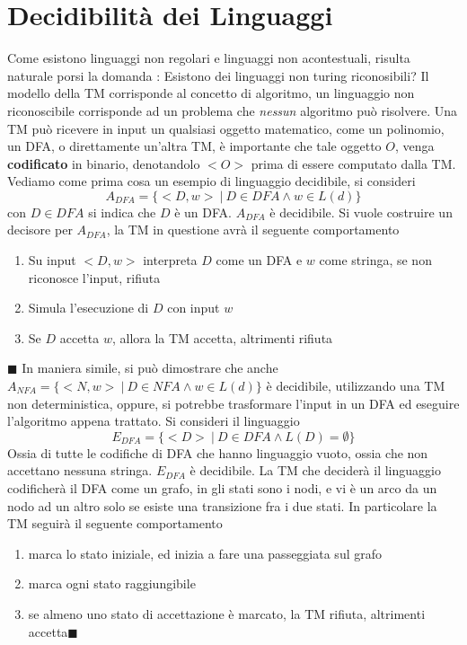 \documentclass[10pt, letterpaper]{report}
\begin{document}
\section{Decidibilità dei Linguaggi}
Come esistono linguaggi non regolari e linguaggi non acontestuali, risulta naturale porsi la domanda : Esistono dei linguaggi non turing riconosibili? Il modello della TM corrisponde al concetto di algoritmo, un linguaggio non riconoscibile corrisponde ad un problema che \textit{nessun} algoritmo può risolvere.\acc 
Una TM può ricevere in input un qualsiasi oggetto matematico, come un polinomio, un DFA, o direttamente un'altra TM, è importante che tale oggetto $O$, venga \textbf{codificato} in binario, denotandolo $<O>$ prima di essere computato dalla TM.\acc 
Vediamo come prima cosa un esempio di linguaggio decidibile, si consideri 
$$A_{DFA}=\{<D,w>\ |\ D \in DFA \land w\in L(d)\}$$
con $D\in DFA$ si indica che $D$ è un DFA. \acc 
\prop{} $A_{DFA}$ è decidibile. \acc 
\dimo{} Si vuole costruire un decisore per $A_{DFA}$, la TM in questione avrà il seguente comportamento\begin{enumerate}
    \item Su input $<D,w>$ interpreta $D$ come un DFA e $w$ come stringa, se non riconosce l'input, rifiuta 
    \item Simula l'esecuzione di $D$ con input $w$
    \item Se $D$ accetta $w$, allora la TM accetta, altrimenti rifiuta
\end{enumerate}
\hfill $\blacksquare$\acc 
In maniera simile, si può dimostrare che anche  $A_{NFA}=\{<N,w>\ |\ D \in NFA \land w\in L(d)\}$ è decidibile, utilizzando una TM non deterministica, oppure, si potrebbe trasformare l'input in un DFA ed eseguire l'algoritmo appena trattato. \acc  
Si consideri il linguaggio 
$$ E_{DFA}=\{<D>\ | \ D\in DFA \land L(D)=\emptyset\}$$
Ossia di tutte le codifiche di DFA che hanno linguaggio vuoto, ossia che non accettano nessuna stringa. \acc 
\prop{} $E_{DFA}$ è decidibile. \acc 
\dimo{} La TM che deciderà il linguaggio codificherà il DFA come un grafo, in gli stati sono i nodi, e vi è un arco da un nodo ad un altro solo se esiste una transizione fra i due stati. In particolare la TM seguirà il seguente comportamento\begin{enumerate}
    \item marca lo stato iniziale, ed inizia a fare una passeggiata sul grafo 
    \item marca ogni stato raggiungibile 
    \item se almeno uno stato di accettazione è marcato, la TM rifiuta, altrimenti accetta\hfill $\blacksquare$
\end{enumerate}
\end{document}

